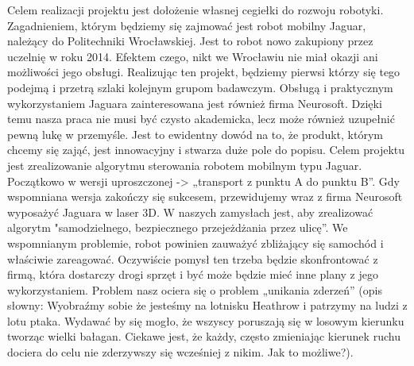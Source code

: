 Celem realizacji projektu jest dołożenie własnej cegiełki do rozwoju robotyki. Zagadnieniem, którym będziemy się zajmować jest robot mobilny Jaguar, należący do Politechniki Wrocławskiej. Jest to robot nowo zakupiony przez uczelnię w roku 2014. Efektem czego, nikt we Wrocławiu nie miał okazji ani możliwości jego obsługi. Realizując ten projekt, będziemy pierwsi którzy się tego podejmą i przetrą szlaki kolejnym grupom badawczym. Obsługą i praktycznym wykorzystaniem Jaguara zainteresowana jest również firma Neurosoft. Dzięki temu nasza praca nie musi być czysto akademicka, lecz może również uzupełnić pewną lukę w przemyśle. Jest to ewidentny dowód na to, że produkt, którym chcemy się zająć, jest innowacyjny i stwarza duże pole do popisu. Celem projektu jest zrealizowanie algorytmu sterowania robotem mobilnym typu Jaguar. Początkowo w wersji uproszczonej -> „transport z punktu A do punktu B”. Gdy wspomniana wersja zakończy się sukcesem, przewidujemy wraz z firma Neurosoft wyposażyć Jaguara w laser 3D. W naszych zamysłach jest, aby zrealizować algorytm "samodzielnego, bezpiecznego przejeżdżania przez ulicę”. We wspomnianym problemie, robot powinien zauważyć zbliżający się samochód i właściwie zareagować. Oczywiście pomysł ten trzeba będzie skonfrontować z firmą, która dostarczy drogi sprzęt i być może będzie mieć inne plany z jego wykorzystaniem. Problem nasz ociera się o problem „unikania zderzeń” (opis słowny: Wyobraźmy sobie że jesteśmy na lotnisku Heathrow i patrzymy na ludzi z lotu ptaka. Wydawać by się mogło, że wszyscy poruszają się w losowym kierunku tworząc wielki bałagan. Ciekawe jest, że każdy, często zmieniając kierunek ruchu dociera do celu nie zderzywszy się wcześniej z nikim. Jak to możliwe?).\newline
